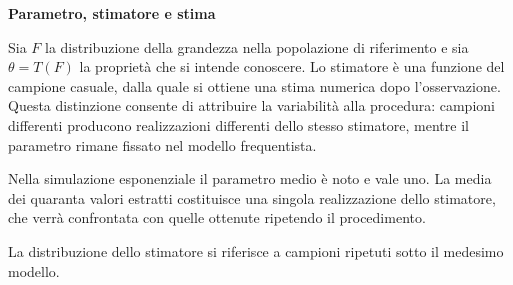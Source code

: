 \documentclass[12pt,aspectratio=1610]{beamer}
\begin{document}
\begin{lrbox}{\TitleBox}\begin{minipage}[t]{18.2cm}\raggedright\sloppy\color{Ink}\fontsize{20.7}{24}\selectfont \bfseries\color{Navy}Parametro, stimatore e stima\end{minipage}\end{lrbox}
\begin{lrbox}{\BodyBox}\begin{minipage}[t]{10.25cm}\raggedright\sloppy\color{Ink}\fontsize{12.4}{16.4}\selectfont Sia $F$ la distribuzione della grandezza nella popolazione di riferimento e sia $\theta=T(F)$ la proprietà che si intende conoscere. Lo stimatore è una funzione del campione casuale, dalla quale si ottiene una stima numerica dopo l’osservazione. Questa distinzione consente di attribuire la variabilità alla procedura: campioni differenti producono realizzazioni differenti dello stesso stimatore, mentre il parametro rimane fissato nel modello frequentista.\par{}\end{minipage}\end{lrbox}
\begin{lrbox}{\SideBox}\begin{minipage}[t]{7.45cm}\raggedright\sloppy\color{Ink}\fontsize{12.2}{16.1}\selectfont Nella simulazione esponenziale il parametro medio è noto e vale uno. La media dei quaranta valori estratti costituisce una singola realizzazione dello stimatore, che verrà confrontata con quelle ottenute ripetendo il procedimento.\par\vspace{.25cm}\end{minipage}\end{lrbox}
\begin{lrbox}{\RecallBox}\begin{minipage}[t]{16.45cm}\raggedright\sloppy\color{Ink}\fontsize{10.1}{13.2}\selectfont La distribuzione dello stimatore si riferisce a campioni ripetuti sotto il medesimo modello.\end{minipage}\end{lrbox}
\end{document}
